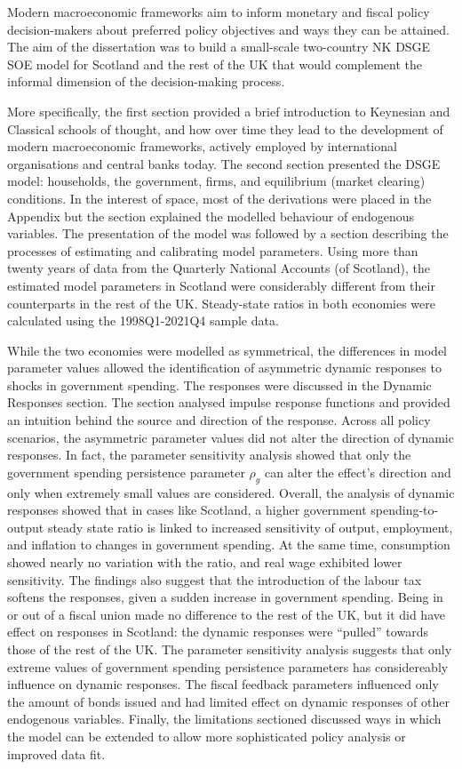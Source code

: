 Modern macroeconomic frameworks aim to inform monetary and fiscal policy decision-makers about preferred policy objectives and ways they can be attained. The aim of the dissertation was to build a small-scale two-country NK DSGE SOE model for Scotland and the rest of the UK that would complement the informal dimension of the decision-making process. 

More specifically, the first section provided a brief introduction to Keynesian and Classical schools of thought, and how over time they lead to the development of modern macroeconomic frameworks, actively employed by international organisations and central banks today. The second section presented the DSGE model: households, the government, firms, and equilibrium (market clearing) conditions. In the interest of space, most of the derivations were placed in the Appendix but the section explained the modelled behaviour of endogenous variables. The presentation of the model was followed by a section describing the processes of estimating and calibrating model parameters. Using more than twenty years of data from the Quarterly National Accounts (of Scotland), the estimated model parameters in Scotland were considerably different from their counterparts in the rest of the UK. Steady-state ratios in both economies were calculated using the 1998Q1-2021Q4 sample data.

While the two economies were modelled as symmetrical, the differences in model parameter values allowed the identification of asymmetric dynamic responses to shocks in government spending. The responses were discussed in the Dynamic Responses section. The section analysed impulse response functions and provided an intuition behind the source and direction of the response. Across all policy scenarios, the asymmetric parameter values did not alter the direction of dynamic responses. In fact, the parameter sensitivity analysis showed that only the government spending persistence parameter $\rho_g$ can alter the effect's direction and only when extremely small values are considered. Overall, the analysis of dynamic responses showed that in cases like Scotland, a higher government spending-to-output steady state ratio is linked to increased sensitivity of output, employment, and inflation to changes in government spending. At the same time, consumption showed nearly no variation with the ratio, and real wage exhibited lower sensitivity. The findings also suggest that the introduction of the labour tax softens the responses, given a sudden increase in government spending. Being in or out of a fiscal union made no difference to the rest of the UK, but it did have effect on responses in Scotland: the dynamic responses were ``pulled'' towards those of the rest of the UK. The parameter sensitivity analysis suggests that only extreme values of government spending persistence parameters has considereably influence on dynamic responses. The fiscal feedback parameters influenced only the amount of bonds issued and had limited effect on dynamic responses of other endogenous variables. Finally, the limitations sectioned discussed ways in which the model can be extended to allow more sophisticated policy analysis or improved data fit.